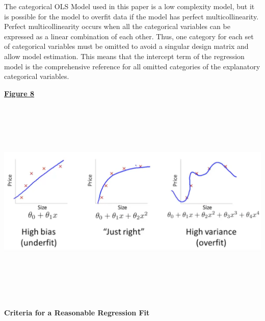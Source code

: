\documentclass[preprint,12pt,times]{elsarticle}
\begin{document}
The categorical OLS Model used in this paper is a low complexity model, but it is possible for the model to overfit data if the model has perfect multicollinearity.  Perfect multicollinearity occurs when all the categorical variables can be expressed as a linear combination of each other.  Thus, one category for each set of categorical variables must be omitted to avoid a singular design matrix and allow model estimation.  This means that the intercept term of the regression model is the comprehensive reference for all omitted categories of the explanatory categorical variables.\\

\begin{flushleft}
\begin{large}
\ul{\textbf{Figure 8}}
\end{large}
\includegraphics[width=17cm,height=10cm]{Picture20.png}
\begin{footnotesize}
Source: https://python-data-science.readthedocs.io/en/latest/general.html}
\end{footnotesize}
\end{flushleft}

\noindent
\textbf{Criteria for a Reasonable Regression Fit}
\end{document}
